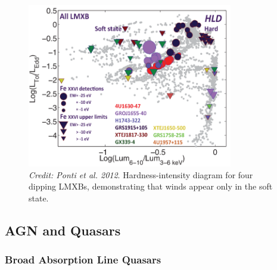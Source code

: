 \begin{figure}
\centering
\includegraphics[width=0.8\textwidth]{figures/01-intro/ponti_hid.png}
\caption
{
{\sl Credit: Ponti et al. 2012}. 
Hardness-intensity diagram for four dipping LMXBs,
demonstrating that winds appear only in the soft state.
} 
\label{fig:ponti_hid}
\end{figure}


\subsection{AGN and Quasars}
\label{sec:agn_winds}

\subsubsection{Broad Absorption Line Quasars}

